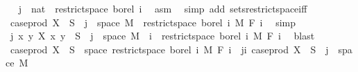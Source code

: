 \begin{isabellebody}
\ \isamarkupfalse%
\ {\isachardoublequoteopen}{\isacharbraceleft}{\kern0pt}j\ {\isacharcolon}{\kern0pt}{\isacharcolon}{\kern0pt}\ nat{\isacharbraceright}{\kern0pt}\ {\isasymin}\ restrict{\isacharunderscore}{\kern0pt}space\ borel\ {\isacharbraceleft}{\kern0pt}{}{\isachardot}{\kern0pt}{\isachardot}{\kern0pt}i{\isacharbraceright}{\kern0pt}{\isachardoublequoteclose}\ \isamarkupfalse%
\ asm\ \isamarkupfalse%
\ {\isacharparenleft}{\kern0pt}simp\ add{\isacharcolon}{\kern0pt}\ sets{\isacharunderscore}{\kern0pt}restrict{\isacharunderscore}{\kern0pt}space{\isacharunderscore}{\kern0pt}iff{\isacharparenright}{\kern0pt}\isanewline
\ \ \ \ \isamarkupfalse%
\ \isamarkupfalse%
\ {\isachardoublequoteopen}case{\isacharunderscore}{\kern0pt}prod\ X\ {\isacharminus}{\kern0pt}{\isacharbackquote}{\kern0pt}\ S\ {\isasyminter}\ {\isacharbraceleft}{\kern0pt}j{\isacharbraceright}{\kern0pt}\ {\isasymtimes}\ space\ M\ {\isasymin}\ restrict{\isacharunderscore}{\kern0pt}space\ borel\ {\isacharbraceleft}{\kern0pt}{}{\isachardot}{\kern0pt}{\isachardot}{\kern0pt}i{\isacharbraceright}{\kern0pt}\ {\isasymOtimes}\isactrlsub M\ F\ i{\isachardoublequoteclose}\ \isamarkupfalse%
\ simp\isanewline
\ \ \isacommand{{\isacharbraceright}{\kern0pt}}\isamarkupfalse%
\isanewline
\ \ \isamarkupfalse%
\ {\isachardoublequoteopen}{\isacharparenleft}{\kern0pt}{\isasymlambda}j{\isachardot}{\kern0pt}\ {\isacharparenleft}{\kern0pt}{\isasymlambda}{\isacharparenleft}{\kern0pt}x{\isacharcomma}{\kern0pt}\ y{\isacharparenright}{\kern0pt}{\isachardot}{\kern0pt}\ X\ x\ y{\isacharparenright}{\kern0pt}\ {\isacharminus}{\kern0pt}{\isacharbackquote}{\kern0pt}\ S\ {\isasyminter}\ {\isacharbraceleft}{\kern0pt}j{\isacharbraceright}{\kern0pt}\ {\isasymtimes}\ space\ M{\isacharparenright}{\kern0pt}\ {\isacharbackquote}{\kern0pt}\ {\isacharbraceleft}{\kern0pt}{\isachardot}{\kern0pt}{\isachardot}{\kern0pt}i{\isacharbraceright}{\kern0pt}\ {\isasymsubseteq}\ restrict{\isacharunderscore}{\kern0pt}space\ borel\ {\isacharbraceleft}{\kern0pt}{}{\isachardot}{\kern0pt}{\isachardot}{\kern0pt}i{\isacharbraceright}{\kern0pt}\ {\isasymOtimes}\isactrlsub M\ F\ i{\isachardoublequoteclose}\ \isamarkupfalse%
\ blast\isanewline
\ \ \isamarkupfalse%
\ \isamarkupfalse%
\ {\isachardoublequoteopen}case{\isacharunderscore}{\kern0pt}prod\ X\ {\isacharminus}{\kern0pt}{\isacharbackquote}{\kern0pt}\ S\ {\isasyminter}\ space\ {\isacharparenleft}{\kern0pt}restrict{\isacharunderscore}{\kern0pt}space\ borel\ {\isacharbraceleft}{\kern0pt}{}{\isachardot}{\kern0pt}{\isachardot}{\kern0pt}i{\isacharbraceright}{\kern0pt}\ {\isasymOtimes}\isactrlsub M\ F\ i{\isacharparenright}{\kern0pt}\ {\isacharequal}{\kern0pt}\ {\isacharparenleft}{\kern0pt}{\isasymUnion}j{\isasymle}i{\isachardot}{\kern0pt}\ case{\isacharunderscore}{\kern0pt}prod\ X\ {\isacharminus}{\kern0pt}{\isacharbackquote}{\kern0pt}\ S\ {\isasyminter}\ {\isacharbraceleft}{\kern0pt}j{\isacharbraceright}{\kern0pt}\ {\isasymtimes}\ space\ M{\isacharparenright}{\kern0pt}{\isachardoublequoteclose}\ \isamarkupfalse%

\end{isabellebody}
